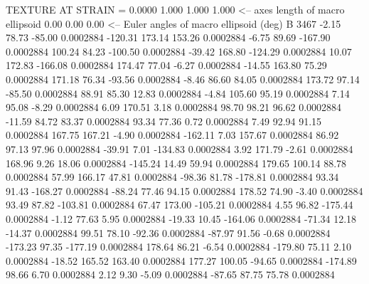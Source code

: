 TEXTURE AT STRAIN =    0.0000
   1.000   1.000   1.000  <-- axes length of macro ellipsoid
    0.00    0.00    0.00  <-- Euler angles of macro ellipsoid (deg)
B      3467
       -2.15       78.73      -85.00     0.0002884
     -120.31      173.14      153.26     0.0002884
       -6.75       89.69     -167.90     0.0002884
      100.24       84.23     -100.50     0.0002884
      -39.42      168.80     -124.29     0.0002884
       10.07      172.83     -166.08     0.0002884
      174.47       77.04       -6.27     0.0002884
      -14.55      163.80       75.29     0.0002884
      171.18       76.34      -93.56     0.0002884
       -8.46       86.60       84.05     0.0002884
      173.72       97.14      -85.50     0.0002884
       88.91       85.30       12.83     0.0002884
       -4.84      105.60       95.19     0.0002884
        7.14       95.08       -8.29     0.0002884
        6.09      170.51        3.18     0.0002884
       98.70       98.21       96.62     0.0002884
      -11.59       84.72       83.37     0.0002884
       93.34       77.36        0.72     0.0002884
        7.49       92.94       91.15     0.0002884
      167.75      167.21       -4.90     0.0002884
     -162.11        7.03      157.67     0.0002884
       86.92       97.13       97.96     0.0002884
      -39.91        7.01     -134.83     0.0002884
        3.92      171.79       -2.61     0.0002884
      168.96        9.26       18.06     0.0002884
     -145.24       14.49       59.94     0.0002884
      179.65      100.14       88.78     0.0002884
       57.99      166.17       47.81     0.0002884
      -98.36       81.78     -178.81     0.0002884
       93.34       91.43     -168.27     0.0002884
      -88.24       77.46       94.15     0.0002884
      178.52       74.90       -3.40     0.0002884
       93.49       87.82     -103.81     0.0002884
       67.47      173.00     -105.21     0.0002884
        4.55       96.82     -175.44     0.0002884
       -1.12       77.63        5.95     0.0002884
      -19.33       10.45     -164.06     0.0002884
      -71.34       12.18      -14.37     0.0002884
       99.51       78.10      -92.36     0.0002884
      -87.97       91.56       -0.68     0.0002884
     -173.23       97.35     -177.19     0.0002884
      178.64       86.21       -6.54     0.0002884
     -179.80       75.11        2.10     0.0002884
      -18.52      165.52      163.40     0.0002884
      177.27      100.05      -94.65     0.0002884
     -174.89       98.66        6.70     0.0002884
        2.12        9.30       -5.09     0.0002884
      -87.65       87.75       75.78     0.0002884
